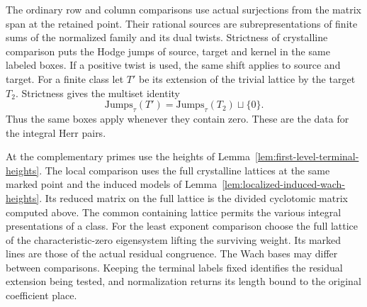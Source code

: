 The ordinary row and column comparisons use actual surjections
from the matrix span at the retained point. Their rational sources
are subrepresentations of finite sums of the normalized family and
its dual twists. Strictness of crystalline comparison puts the
Hodge jumps of source, target and kernel in the same labeled
boxes. If a positive twist is used, the same shift applies to
source and target. For a finite class let \(T'\) be its extension of the trivial lattice by the target \(T_2\). Strictness gives the multiset identity
\[
 \mathrm{Jumps}_\tau(T')=\mathrm{Jumps}_\tau(T_2)\sqcup\{0\}.
\]
Thus the same boxes apply whenever they contain zero. These are the data for the integral Herr pairs.

At the complementary primes use the heights of
Lemma~\ref{lem:first-level-terminal-heights}. The local comparison
uses the full
crystalline lattices at the same marked point and the induced
models of Lemma~\ref{lem:localized-induced-wach-heights}. Its
reduced matrix on the full lattice is the divided cyclotomic
matrix computed above. The common containing lattice permits
the various integral presentations of a class. For the least
exponent comparison choose the full lattice of the characteristic-zero
eigensystem lifting the surviving weight. Its marked lines are
those of the actual residual congruence. The Wach bases may differ between comparisons. Keeping the terminal labels fixed identifies the residual extension being tested, and normalization returns its length bound to the original coefficient place.
